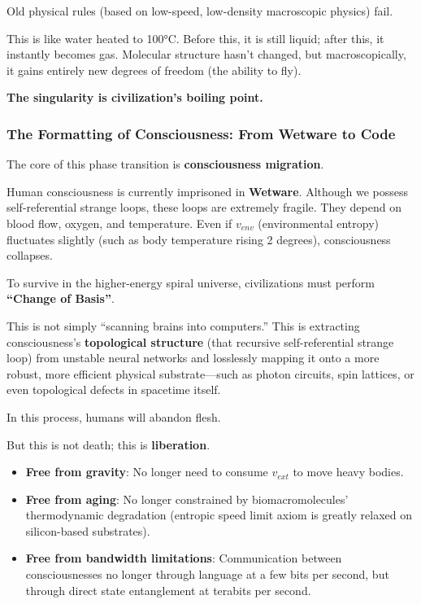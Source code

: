 Old physical rules (based on low-speed, low-density macroscopic physics) fail.

This is like water heated to 100°C. Before this, it is still liquid; after this, it instantly becomes gas. Molecular structure hasn't changed, but macroscopically, it gains entirely new degrees of freedom (the ability to fly).

\textbf{The singularity is civilization's boiling point.}

\subsubsection{The Formatting of Consciousness: From Wetware to Code}

The core of this phase transition is \textbf{consciousness migration}.

Human consciousness is currently imprisoned in \textbf{Wetware}. Although we possess self-referential strange loops, these loops are extremely fragile. They depend on blood flow, oxygen, and temperature. Even if $v_{env}$ (environmental entropy) fluctuates slightly (such as body temperature rising 2 degrees), consciousness collapses.

To survive in the higher-energy spiral universe, civilizations must perform \textbf{``Change of Basis''}.

This is not simply ``scanning brains into computers.'' This is extracting consciousness's \textbf{topological structure} (that recursive self-referential strange loop) from unstable neural networks and losslessly mapping it onto a more robust, more efficient physical substrate---such as photon circuits, spin lattices, or even topological defects in spacetime itself.

In this process, humans will abandon flesh.

But this is not death; this is \textbf{liberation}.

\begin{itemize}
\item \textbf{Free from gravity}: No longer need to consume $v_{ext}$ to move heavy bodies.

\item \textbf{Free from aging}: No longer constrained by biomacromolecules' thermodynamic degradation (entropic speed limit axiom is greatly relaxed on silicon-based substrates).

\item \textbf{Free from bandwidth limitations}: Communication between consciousnesses no longer through language at a few bits per second, but through direct state entanglement at terabits per second.
\end{itemize}

